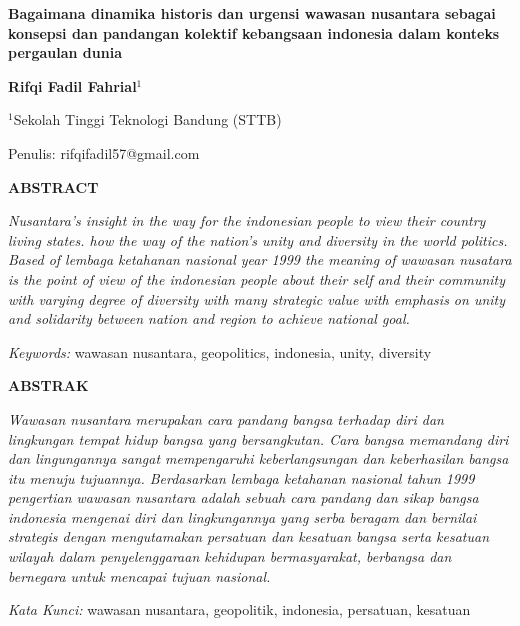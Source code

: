 \documentclass[12pt, a4paper]{article}
\newcommand{\makecustomtitle}[1]{\begin{center}\large\bfseries\fontsize{12pt}{14pt}\MakeUppercase{#1}\end{center}\vspace{0.5cm}}
\begin{document}
\begin{titlepage}
    \centering
    \vspace*{2cm}
    {\LARGE\bfseries Bagaimana dinamika historis dan urgensi wawasan nusantara sebagai konsepsi dan pandangan kolektif kebangsaan indonesia dalam konteks pergaulan dunia\par}
    \vspace{1cm}
    {\large\bfseries Rifqi Fadil Fahrial$^1$\par}
    \vspace{0.5cm}
    \normalsize
    $^1$Sekolah Tinggi Teknologi Bandung (STTB)\par
    \vspace{0.5cm}
    Penulis: rifqifadil57@gmail.com
    \vfill
\end{titlepage}

\makecustomtitle{ABSTRACT}
\begin{minipage}{\textwidth}
\singlespacing
\justifying
\textit{\small
Nusantara's insight in the way for the indonesian people to view their country living states. how the way of the nation's unity and diversity in the world politics. Based of \textit{lembaga ketahanan nasional} year 1999 the meaning of wawasan nusatara is the point of view of the indonesian people about their self and their community with varying degree of diversity with many strategic value with emphasis on unity and solidarity between nation and region to achieve national goal.}
\vspace{0.5em}
\par\noindent
\textit{Keywords:} wawasan nusantara, geopolitics, indonesia, unity, diversity
\end{minipage}
\vspace{1cm}

\makecustomtitle{ABSTRAK}
\begin{minipage}{\textwidth}
\singlespacing
\justifying
\textit{\small
Wawasan nusantara merupakan cara pandang bangsa terhadap diri dan lingkungan tempat hidup bangsa yang bersangkutan. Cara bangsa memandang diri dan lingungannya sangat mempengaruhi keberlangsungan dan keberhasilan bangsa itu menuju tujuannya. Berdasarkan lembaga ketahanan nasional tahun 1999 pengertian wawasan nusantara adalah sebuah cara pandang dan sikap bangsa indonesia mengenai diri dan lingkungannya yang serba beragam dan bernilai strategis dengan mengutamakan persatuan dan kesatuan bangsa serta kesatuan wilayah dalam penyelenggaraan kehidupan bermasyarakat, berbangsa dan bernegara untuk mencapai tujuan nasional.}
\vspace{0.5em}
\par\noindent
\textit{Kata Kunci:} wawasan nusantara, geopolitik, indonesia, persatuan, kesatuan
\end{minipage}
\vspace{1cm}
\end{document}
